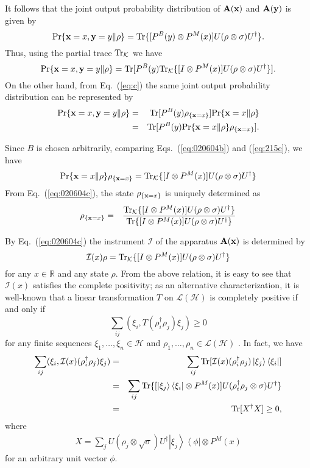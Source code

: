 \documentclass[graybox]{svmult}
\newcommand{\beq}{\begin{equation}}
\newcommand{\eeq}{\end{equation}}
\newcommand{\beql}[1]{\begin{equation}\label{eq:#1}}
\newcommand{\beqas}{\begin{eqnarray*}}
\newcommand{\eeqas}{\end{eqnarray*}}
\newcommand{\bA}{{\bf A}}
\newcommand{\cH}{{\mathcal H}}
\newcommand{\cI}{{\mathcal I}}
\newcommand{\cK}{{\mathcal K}}
\newcommand{\cL}{{\mathcal L}}
\newcommand{\da}{\dagger}
\newcommand{\nn}{\nonumber}
\newcommand{\ph}{\phi}
\newcommand{\rh}{\rho}
\newcommand{\si}{\sigma}
\newcommand{\tc}{\cL}
\newcommand{\Eq}[1]{Eq.~(\ref{eq:#1})}
\newcommand{\Tr}{\mbox{\rm Tr}}
\newcommand{\bx}{{\bf x}}
\newcommand{\by}{{\bf y}}
\newcommand{\eq}[1]{(\ref{eq:#1})}
\newcommand{\R}{\mathbb{R}}
\newcommand{\bra}[1]{\left\langle#1\right|}
\newcommand{\ket}[1]{\left|#1\right\rangle}
\begin{document}
It follows that the joint output probability distribution of 
 $\bA(\bx)$ and $\bA(\by)$ is given by
\beq
{\rm Pr}\{\bx=x,\by=y\|\rh\}
=\Tr\{[P^{B}(y)\otimes P^{M}(x)]
U(\rh\otimes\sigma)U^{\dagger}\}.
\label{eq:215d}
\eeq
Thus, using the partial trace $\Tr_{\cK}$ we have
\beq
\Pr\{\bx=x,\by=y\|\rh\}
=\Tr[P^{B}(y) \Tr_{\cK}\{[I\otimes P^{M}(x)]U(\rh\otimes\sigma)U^{\dagger}\}].
\label{eq:020604b}
\eeq
On the other hand, from \Eq{c}
the same joint output probability distribution can be represented by
\begin{eqnarray}
{\rm Pr}\{\bx=x,\by=y\|\rh\}
&=&
{\Tr}[P^{B}(y)\rh_{\{\bx=x\}}]
{\Pr}\{\bx=x\|\rh\}\nn\\
&=&
{\Tr}[P^{B}(y){\Pr}\{\bx=x\|\rh\}\rh_{\{\bx=x\}}].
\label{eq:215e}
\end{eqnarray}

Since $B$ is chosen arbitrarily,
comparing Eqs.~\eq{020604b} and \eq{215e}, we have
\beql{020604c}
{\Pr}\{\bx=x\|\rh\}\rh_{\{\bx=x\}}=
\Tr_{\cK}\{[I\otimes P^{M}(x)]
U(\rh\otimes\sigma)U^{\dagger}\}
\eeq
From \Eq{020604c}, the state 
$\rh_{\{\bx=x\}}$ is uniquely determined as
\begin{eqnarray}
\rh_{\{\bx=x\}}
&=&
\frac{\Tr_{{\cal K}}\{[I\otimes P^{M}(x)]
U(\rh\otimes\sigma)U^{\dagger}\}}
     {\Tr\{[I\otimes
P^{M}(x)]U(\rh\otimes\sigma)U^{\dagger}\}}
\label{eq:215f}
\end{eqnarray}


By \Eq{020604c} the instrument $\cI$ of the apparatus $\bA(\bx)$
is determined  by
\beql{020609a}
\cI(x)\rh=\Tr_{{\cal K}}\{[I\otimes P^{M}(x)]
U(\rh\otimes\sigma)U^{\dagger}\}
\eeq
for any $x\in\R$ and any state $\rh$.
From the above relation, it is easy to see that
$\cI(x)$ satisfies the complete positivity;
as an alternative characterization, 
it is well-known that a linear transformation $T$ on
$\tc(\cH)$ is completely positive if and only if 
\beq
\sum_{ij}
(\xi_{i},T(\rh_{i}^{\da}\rh_{j})\xi_{j})\ge 0
\eeq
for any finite sequences $\xi_{1},\ldots,\xi_{n}\in\cH$ and 
$\rh_{1},\ldots,\rh_{n}\in\tc(\cH)$ \cite{84QC}.
In fact, we have
\beqas
\sum_{ij}
(\xi_{i},\cI(x)(\rh_{i}^{\da}\rh_{j})\xi_{j})
&=&\sum_{ij}\Tr[\cI(x)(\rh_{i}^{\da}\rh_{j})\ket{\xi_{j}}\bra{\xi_i}]\\
&=&\sum_{ij}\Tr\{[\ket{\xi_{j}}\bra{\xi_i}\otimes P^{M}(x)]U(\rh_{i}^{\da}\rh_{j}\otimes \si)U^{\da}\}\\
&=&\Tr[X^{\da}X]\ge 0,
\eeqas
where 
\beqas
X=\sum_{j}U(\rh_j\otimes \sqrt{\si})U^{\da}\ket{\xi_j}\bra{\ph}\otimes P^{M}(x)
\eeqas
for an arbitrary unit vector $\ph$.
\end{document}
